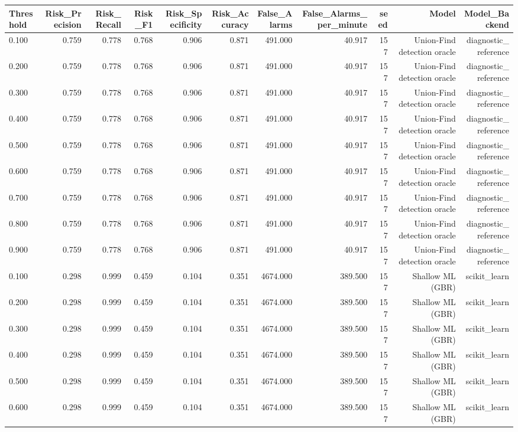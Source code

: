 \begin{tabular}{lrrrrrrrrrr}
\toprule
Threshold & Risk\_Precision & Risk\_Recall & Risk\_F1 & Risk\_Specificity & Risk\_Accuracy & False\_Alarms & False\_Alarms\_per\_minute & seed & Model & Model\_Backend \\
\midrule
0.100 & 0.759 & 0.778 & 0.768 & 0.906 & 0.871 & 491.000 & 40.917 & 157 & Union-Find detection oracle & diagnostic\_reference \\
0.200 & 0.759 & 0.778 & 0.768 & 0.906 & 0.871 & 491.000 & 40.917 & 157 & Union-Find detection oracle & diagnostic\_reference \\
0.300 & 0.759 & 0.778 & 0.768 & 0.906 & 0.871 & 491.000 & 40.917 & 157 & Union-Find detection oracle & diagnostic\_reference \\
0.400 & 0.759 & 0.778 & 0.768 & 0.906 & 0.871 & 491.000 & 40.917 & 157 & Union-Find detection oracle & diagnostic\_reference \\
0.500 & 0.759 & 0.778 & 0.768 & 0.906 & 0.871 & 491.000 & 40.917 & 157 & Union-Find detection oracle & diagnostic\_reference \\
0.600 & 0.759 & 0.778 & 0.768 & 0.906 & 0.871 & 491.000 & 40.917 & 157 & Union-Find detection oracle & diagnostic\_reference \\
0.700 & 0.759 & 0.778 & 0.768 & 0.906 & 0.871 & 491.000 & 40.917 & 157 & Union-Find detection oracle & diagnostic\_reference \\
0.800 & 0.759 & 0.778 & 0.768 & 0.906 & 0.871 & 491.000 & 40.917 & 157 & Union-Find detection oracle & diagnostic\_reference \\
0.900 & 0.759 & 0.778 & 0.768 & 0.906 & 0.871 & 491.000 & 40.917 & 157 & Union-Find detection oracle & diagnostic\_reference \\
0.100 & 0.298 & 0.999 & 0.459 & 0.104 & 0.351 & 4674.000 & 389.500 & 157 & Shallow ML (GBR) & scikit\_learn \\
0.200 & 0.298 & 0.999 & 0.459 & 0.104 & 0.351 & 4674.000 & 389.500 & 157 & Shallow ML (GBR) & scikit\_learn \\
0.300 & 0.298 & 0.999 & 0.459 & 0.104 & 0.351 & 4674.000 & 389.500 & 157 & Shallow ML (GBR) & scikit\_learn \\
0.400 & 0.298 & 0.999 & 0.459 & 0.104 & 0.351 & 4674.000 & 389.500 & 157 & Shallow ML (GBR) & scikit\_learn \\
0.500 & 0.298 & 0.999 & 0.459 & 0.104 & 0.351 & 4674.000 & 389.500 & 157 & Shallow ML (GBR) & scikit\_learn \\
0.600 & 0.298 & 0.999 & 0.459 & 0.104 & 0.351 & 4674.000 & 389.500 & 157 & Shallow ML (GBR) & scikit\_learn \\

\end{tabular}
